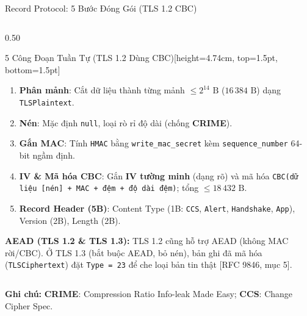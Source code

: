 \documentclass[aspectratio=169, 10pt]{beamer}
\newcommand{\abbrbar}[1]{%
	\par\vspace{0.06cm}%
	\begin{uetcard}[colback=uetlightgray, colframe=uetborder, boxrule=0.5pt, sharp corners, arc=0pt, left=5pt, right=5pt, top=1.6pt, bottom=1.6pt, boxsep=0.4pt, before skip=0pt, after skip=0pt, no shadow]
		\raggedright\fontsize{5.35pt}{6.55pt}\selectfont\color{uetdark}%
		{\color{uetblue}\textbf{Ghi chú:}} #1%
	\end{uetcard}%
}
\begin{document}
\begin{frame}{Record Protocol: 5 Bước Đóng Gói (TLS 1.2 CBC)}
\begin{columns}[T]
		\begin{column}{0.50\textwidth}
			\begin{accentcard}[uetblue]{5 Công Đoạn Tuần Tự (TLS 1.2 Dùng CBC)}[height=4.74cm, top=1.5pt, bottom=1.5pt]
				\begin{enumerate}\setlength{\itemsep}{0.15pt}\setlength{\topsep}{0.2pt}\fontsize{6.0pt}{7.15pt}\selectfont
					\item \textbf{Phân mảnh}: Cắt dữ liệu thành từng mảnh $\le 2^{14}\text{ B}$ ($16\,384\text{ B}$) dạng \texttt{TLSPlaintext}.
					\item \textbf{Nén}: Mặc định \texttt{null}, loại rò rỉ độ dài (chống \textbf{CRIME}).
					\item \textbf{Gắn MAC}: Tính \texttt{HMAC} bằng \texttt{write\_mac\_secret} kèm \texttt{sequence\_number} 64-bit ngầm định.
					\item \textbf{IV \& Mã hóa CBC}: Gắn \textbf{IV tường minh} (dạng rõ) và mã hóa \texttt{CBC(dữ liệu [nén] + MAC + đệm + độ dài đệm)}; tổng $\le 18\,432\text{ B}$.
					\item \textbf{Record Header (5B)}: Content Type (1B: \texttt{CCS}, \texttt{Alert}, \texttt{Handshake}, \texttt{App}), Version (2B), Length (2B).
				\end{enumerate}
				\vspace{1.0pt}
				\begin{uetcard}[colback=uetaccentbg, top=1.3pt, bottom=1.3pt, left=4.5pt, right=4.5pt, sharp corners, arc=0pt]
					\fontsize{5.3pt}{6.35pt}\selectfont
					{\color{uetblue}\textbf{AEAD (TLS 1.2 \& TLS 1.3):}} TLS 1.2 cũng hỗ trợ AEAD (không MAC rời/CBC). Ở TLS 1.3 (bắt buộc AEAD, bỏ nén), bản ghi đã mã hóa (\texttt{TLSCiphertext}) đặt \texttt{Type = 23} để che loại bản tin thật [RFC 9846, mục 5].
				\end{uetcard}
			\end{accentcard}
		\end{column}
	\end{columns}
	\abbrbar{\textbf{CRIME}: Compression Ratio Info-leak Made Easy; \textbf{CCS}: Change Cipher Spec.}
\end{frame}
\end{document}
